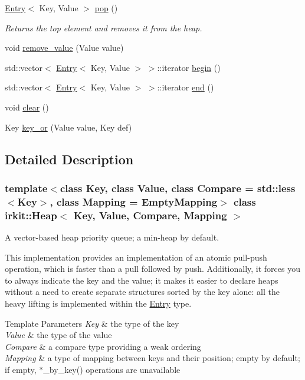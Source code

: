 \begin{DoxyCompactItemize}
\hyperlink{structirkit_1_1Entry}{Entry}$<$ Key, Value $>$ \hyperlink{classirkit_1_1Heap_afd4759dce1fe72d513e4b8e7766ec94e}{pop} ()
\begin{DoxyCompactList}\small\item\em Returns the top element and removes it from the heap. \end{DoxyCompactList}\item 
void \hyperlink{classirkit_1_1Heap_a0da9e0bc583dadad14b10d285e7a8925}{remove\+\_\+value} (Value value)
\item 
std\+::vector$<$ \hyperlink{structirkit_1_1Entry}{Entry}$<$ Key, Value $>$ $>$\+::iterator \hyperlink{classirkit_1_1Heap_af996708917bb42b8cc660988c5c5ed62}{begin} ()
\item 
std\+::vector$<$ \hyperlink{structirkit_1_1Entry}{Entry}$<$ Key, Value $>$ $>$\+::iterator \hyperlink{classirkit_1_1Heap_a8451f5ab1ccb727e7964ce94e5ae3b6c}{end} ()
\item 
void \hyperlink{classirkit_1_1Heap_a06373b7aa5262ffc4efe381042e8cb50}{clear} ()
\item 
Key \hyperlink{classirkit_1_1Heap_a2fffaaf281662d57d13dcc1b0618dc0d}{key\+\_\+or} (Value value, Key def)
\end{DoxyCompactItemize}


\subsection{Detailed Description}
\subsubsection*{template$<$class Key, class Value, class Compare = std\+::less$<$\+Key$>$, class Mapping = Empty\+Mapping$>$\newline
class irkit\+::\+Heap$<$ Key, Value, Compare, Mapping $>$}

A vector-\/based heap priority queue; a min-\/heap by default.

This implementation provides an implementation of an atomic pull-\/push operation, which is faster than a pull followed by push. Additionally, it forces you to always indicate the key and the value; it makes it easier to declare heaps without a need to create separate structures sorted by the key alone\+: all the heavy lifting is implemented within the \hyperlink{structirkit_1_1Entry}{Entry} type.


\begin{DoxyTemplParams}{Template Parameters}
{\em Key} & the type of the key \\
\hline
{\em Value} & the type of the value \\
\hline
{\em Compare} & a compare type providing a weak ordering \\
\hline
{\em Mapping} & a type of mapping between keys and their position; empty by default; if empty, $\ast$\+\_\+by\+\_\+key() operations are unavailable \\
\hline
\end{DoxyTemplParams}


